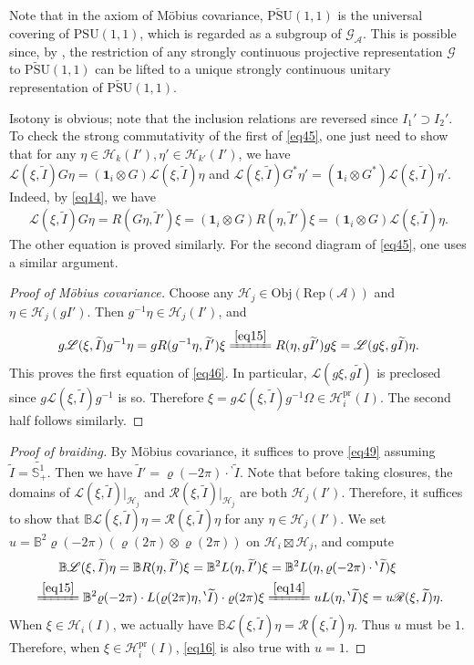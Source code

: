 \documentclass[12pt,a4paper]{article}
\theoremstyle{definition}
\theoremstyle{plain}
\newcommand{\mc}{\mathcal}
\newcommand{\wtd}{\widetilde}
\newcommand{\id}{\mathbf{1}}
\newcommand{\PSU}{\mathrm{PSU}(1,1)}
\newcommand{\UPSU}{\widetilde{\mathrm{PSU}}(1,1)}
\newcommand{\GA}{\mathscr G_{\mathcal A}}
\newcommand{\scr}{\mathscr}
\newcommand{\RepA}{\mathrm{Rep}(\mc A)}
\newcommand{\mbb}{\mathbb}
\newcommand{\Obj}{\mathrm{Obj}}
\newcommand{\bpr}{{}^\backprime}
\newcommand{\pr}{\mathrm{pr}}
\numberwithin{equation}{subsection}
\begin{document}
Note that in the axiom of M\"obius covariance, $\UPSU$ is the universal covering of $\PSU$, which is regarded as a subgroup of $\GA$. This is possible since, by \cite{Bar54}, the restriction of any strongly continuous projective representation $\scr G$ to $\UPSU$ can be lifted to a unique strongly continuous unitary representation of $\UPSU$. 

Isotony is obvious; note that the inclusion relations are reversed since $I_1'\supset I_2'$. To check the strong commutativity of the first of \eqref{eq45}, one just need to show that for any $\eta\in\mc H_k(I'),\eta'\in\mc H_{k'}(I')$, we have $\scr L(\xi,\wtd I)G\eta=(\id_i\otimes G)\scr L(\xi,\wtd I)\eta$ and  $\scr L(\xi,\wtd I)G^*\eta'=(\id_i\otimes G^*)\scr L(\xi,\wtd I)\eta'$. Indeed, by \eqref{eq14}, we have
\begin{align*}
\scr L(\xi,\wtd I)G\eta=R(G\eta,\wtd I')\xi=(\id_i\otimes G)R(\eta,\wtd I')\xi=(\id_i\otimes G)\scr L(\xi,\wtd I)\eta.
\end{align*}
The other equation is proved similarly. For the second diagram of \eqref{eq45}, one uses a similar argument. 

\begin{proof}[Proof of M\"obius covariance]
Choose any $\mc H_j\in\Obj(\RepA)$ and $\eta\in\mc H_j(gI')$. Then $g^{-1}\eta\in\mc H_j(I')$, and 
	\begin{align*}
	g\scr L(\xi,\wtd I)g^{-1}\eta=gR(g^{-1}\eta,\wtd I')\xi \xlongequal{\eqref{eq15}} R(\eta,g\wtd I')g\xi=\scr L(g\xi,g\wtd I)\eta.
	\end{align*}
This proves the first equation of \eqref{eq46}. In particular, $\scr L(g\xi,g\wtd I)$ is preclosed since $g\scr L(\xi,\wtd I)g^{-1}$ is so. Therefore $\xi=g\scr L(\xi,\wtd I)g^{-1}\Omega\in\mc H_i^\pr(I)$. The second half follows similarly.	
\end{proof}	


\begin{proof}[Proof of braiding]
By M\"obius covariance, it suffices to prove \eqref{eq49} assuming $\wtd I=\wtd{\mbb S^1_+}$. Then we have $\wtd I'=\varrho(-2\pi)\cdot\bpr\wtd I$. Note that before taking closures, the domains of $\scr L(\xi,\wtd I)|_{\mc H_j}$ and $\scr R(\xi,\wtd I)|_{\mc H_j}$ are both $\mc H_j(I')$. Therefore, it suffices to show that $\mbb B \scr L(\xi,\wtd I)\eta=\scr R(\xi,\wtd I)\eta$ for any $\eta\in \mc H_j(I')$. We set $u=\mbb B^2\varrho(-2\pi)(\varrho(2\pi)\otimes\varrho(2\pi))$ on $\mc H_i\boxtimes\mc H_j$, and compute
\begin{align}
&~~~~~~ \mbb B \scr L(\xi,\wtd I)\eta=\mbb B R(\eta,\wtd I')\xi=\mbb B^2L(\eta,\wtd I')\xi=\mbb B^2 L(\eta,\varrho(-2\pi)\cdot\bpr\wtd I)\xi\nonumber\\ &\xlongequal{\eqref{eq15}} \mbb B^2\varrho(-2\pi)\cdot L(\varrho(2\pi)\eta,\bpr\wtd I)\cdot \varrho(2\pi)\xi\xlongequal{\eqref{eq14}}uL(\eta,\bpr\wtd I)\xi =u\scr R(\xi,\wtd I)\eta.\label{eq16}
\end{align}
When $\xi\in\mc H_i(I)$, we actually have $\mbb B\scr L(\xi,\wtd I)\eta=\scr R(\xi,\wtd I)\eta$. Thus $u$ must be $1$. Therefore, when $\xi\in\mc H_i^\pr(I)$, \eqref{eq16} is also true with $u=1$.
\end{proof}	
\end{document}
